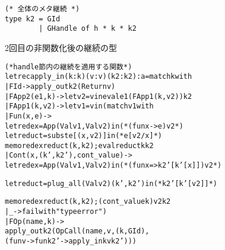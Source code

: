 \begin{figure}[t]
\begin{spacing}{0.9} 
\begin{verbatim}
(* 全体のメタ継続 *)
type k2 = GId
        | GHandle of h * k * k2
\end{verbatim}
\caption{2回目の非関数化後の継続の型}
\label{figure:k2_4defun}
\end{spacing}
\end{figure}

\begin{figure}
\begin{spacing}{0.9} 
\begin{alltt}
(* handle 節内の継続を適用する関数 *)
let rec apply_in (k : k) (v : v) (k2 : k2) : a = match k with
  | FId -> apply_out k2 (Return v)
  | FApp2 (e1, k) -> let v2 = v in eval e1 (FApp1 (k, v2)) k2
  | FApp1 (k, v2) -> let v1 = v in (match v1 with
     | Fun (x, e) ->
       \colorbox{lg}{let redex = App (Val v1, Val v2) in  (* (fun x -> e) v2 *)}
       let reduct = subst e [(x, v2)] in    \colorbox{lg}{(* e[v2/x] *)}
       \colorbox{lg}{memo redex reduct (k, k2);} eval reduct k k2
     | Cont (x, \colorbox{lg}{(k', k2'),} cont_value) ->
       \colorbox{lg}{let redex = App (Val v1, Val v2) in  (* (fun x => k2'[k'[x]]) v2 *)}
\end{alltt}
\vspace{-26pt}
\begin{alltt}
       \colorbox{lg}{let reduct = plug_all (Val v2) (k', k2') in  (* k2'[k'[v2]] *)}
\end{alltt}
\vspace{-26pt}
\begin{alltt}
       \colorbox{lg}{memo redex reduct (k, k2);} (cont_value k) v2 k2
     | _ -> failwith "type error")
  | FOp (name, k) ->
    apply_out k2 (OpCall (name, v, (k, GId),
                          (fun v -> fun k2' -> apply_in k v k2')))


\end{alltt}
\end{spacing}
\end{figure}
